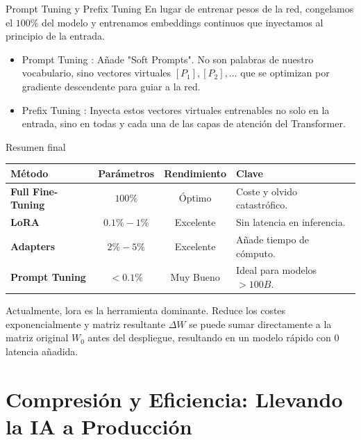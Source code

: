 \begin{frame}{Prompt Tuning y Prefix Tuning}
En lugar de entrenar pesos de la red, congelamos el $100\%$ del modelo y \alert{entrenamos embeddings continuos} que inyectamos al principio de la entrada.

\begin{itemize}
    \item \alert{Prompt Tuning \cite{lester2021power}:} Añade "Soft Prompts". No son palabras de nuestro vocabulario, sino vectores virtuales $[P_1], [P_2], \dots$ que se optimizan por gradiente descendente para guiar a la red.
    \item \alert{Prefix Tuning \cite{li2021prefix}:} Inyecta estos vectores virtuales entrenables no solo en la entrada, sino \alert{en todas y cada una de las capas} de atención del Transformer.
\end{itemize}
\end{frame}

\begin{frame}{Resumen final}

\begin{table}[]
\centering
\small
\begin{tabular}{|l|c|c|l|}
\hline
\textbf{Método} & \textbf{Parámetros} & \textbf{Rendimiento} & \textbf{Clave} \\ \hline
\textbf{Full Fine-Tuning} & $100\%$ & Óptimo & Coste y olvido catastrófico. \\ \hline
\textbf{LoRA} & $0.1\% - 1\%$ & Excelente & Sin latencia en inferencia. \\ \hline
\textbf{Adapters} & $2\% - 5\%$ & Excelente & Añade tiempo de cómputo. \\ \hline
\textbf{Prompt Tuning} & $<0.1\%$ & Muy Bueno & Ideal para modelos $>100B$. \\ \hline
\end{tabular}
\end{table}

Actualmente, \alert{\gls{lora}} es la \alert{herramienta dominante}. Reduce los costes exponencialmente y matriz resultante $\Delta W$ \alert{se puede sumar directamente} a la matriz original $W_0$ antes del despliegue, resultando en un modelo rápido con $0$ latencia añadida.
\end{frame}

\section{Compresión y Eficiencia: Llevando la IA a Producción}

